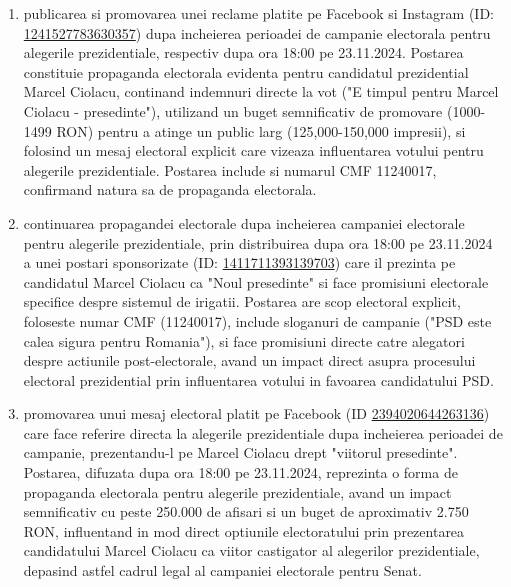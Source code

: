 \documentclass[a4paper,12pt]{article}
\begin{document}
\begin{enumerate}[leftmargin=*, label=\arabic*.)]
    \item publicarea si promovarea unei reclame platite pe Facebook si Instagram (ID: \href{https://www.facebook.com/ads/library/?id=1241527783630357}{1241527783630357}) dupa incheierea perioadei de campanie electorala pentru alegerile prezidentiale, respectiv dupa ora 18:00 pe 23.11.2024. Postarea constituie propaganda electorala evidenta pentru candidatul prezidential Marcel Ciolacu, continand indemnuri directe la vot ("E timpul pentru Marcel Ciolacu - presedinte"), utilizand un buget semnificativ de promovare (1000-1499 RON) pentru a atinge un public larg (125,000-150,000 impresii), si folosind un mesaj electoral explicit care vizeaza influentarea votului pentru alegerile prezidentiale. Postarea include si numarul CMF 11240017, confirmand natura sa de propaganda electorala.
    \item continuarea propagandei electorale dupa incheierea campaniei electorale pentru alegerile prezidentiale, prin distribuirea dupa ora 18:00 pe 23.11.2024 a unei postari sponsorizate (ID: \href{https://www.facebook.com/ads/library/?id=1411711393139703}{1411711393139703}) care il prezinta pe candidatul Marcel Ciolacu ca "Noul presedinte" si face promisiuni electorale specifice despre sistemul de irigatii. Postarea are scop electoral explicit, foloseste numar CMF (11240017), include sloganuri de campanie ("PSD este calea sigura pentru Romania"), si face promisiuni directe catre alegatori despre actiunile post-electorale, avand un impact direct asupra procesului electoral prezidential prin influentarea votului in favoarea candidatului PSD.
    \item promovarea unui mesaj electoral platit pe Facebook (ID \href{https://www.facebook.com/ads/library/?id=2394020644263136}{2394020644263136}) care face referire directa la alegerile prezidentiale dupa incheierea perioadei de campanie, prezentandu-l pe Marcel Ciolacu drept "viitorul presedinte". Postarea, difuzata dupa ora 18:00 pe 23.11.2024, reprezinta o forma de propaganda electorala pentru alegerile prezidentiale, avand un impact semnificativ cu peste 250.000 de afisari si un buget de aproximativ 2.750 RON, influentand in mod direct optiunile electoratului prin prezentarea candidatului Marcel Ciolacu ca viitor castigator al alegerilor prezidentiale, depasind astfel cadrul legal al campaniei electorale pentru Senat.
\end{enumerate}

\vspace{0.5cm}
\end{document}
